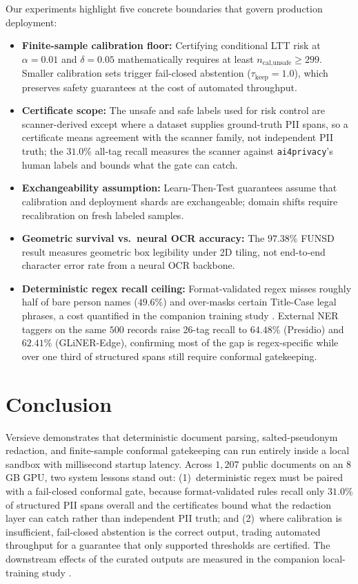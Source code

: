 \documentclass{article}
\begin{document}
Our experiments highlight five concrete boundaries that govern production deployment:
\begin{itemize}
    \item \textbf{Finite-sample calibration floor:} Certifying conditional LTT risk at $\alpha=0.01$ and $\delta=0.05$ mathematically requires at least $n_{\text{cal,unsafe}} \ge 299$. Smaller calibration sets trigger fail-closed abstention ($\tau_{\text{keep}}=1.0$), which preserves safety guarantees at the cost of automated throughput.
    \item \textbf{Certificate scope:} The unsafe and safe labels used for risk control are scanner-derived except where a dataset supplies ground-truth PII spans, so a certificate means agreement with the scanner family, not independent PII truth; the $31.0\%$ all-tag recall measures the scanner against \texttt{ai4privacy}'s human labels and bounds what the gate can catch.
    \item \textbf{Exchangeability assumption:} Learn-Then-Test guarantees assume that calibration and deployment shards are exchangeable; domain shifts require recalibration on fresh labeled samples.
    \item \textbf{Geometric survival vs.\ neural OCR accuracy:} The $97.38\%$ FUNSD result measures geometric box legibility under 2D tiling, not end-to-end character error rate from a neural OCR backbone.
    \item \textbf{Deterministic regex recall ceiling:} Format-validated regex misses roughly half of bare person names ($49.6\%$) and over-masks certain Title-Case legal phrases, a cost quantified in the companion training study \citep{ardiyansyah2026localtraining}. External NER taggers on the same $500$ records raise 26-tag recall to $64.48\%$ (Presidio) and $62.41\%$ (GLiNER-Edge), confirming most of the gap is regex-specific while over one third of structured spans still require conformal gatekeeping.
\end{itemize}

\section{Conclusion}
\label{sec:conclusion}

Versieve demonstrates that deterministic document parsing, salted-pseudonym redaction, and finite-sample conformal gatekeeping can run entirely inside a local sandbox with millisecond startup latency. Across $1{,}207$ public documents on an 8\,GB GPU, two system lessons stand out: (1)~deterministic regex must be paired with a fail-closed conformal gate, because format-validated rules recall only $31.0\%$ of structured PII spans overall and the certificates bound what the redaction layer can catch rather than independent PII truth; and (2)~where calibration is insufficient, fail-closed abstention is the correct output, trading automated throughput for a guarantee that only supported thresholds are certified. The downstream effects of the curated outputs are measured in the companion local-training study \citep{ardiyansyah2026localtraining}.
\end{document}
